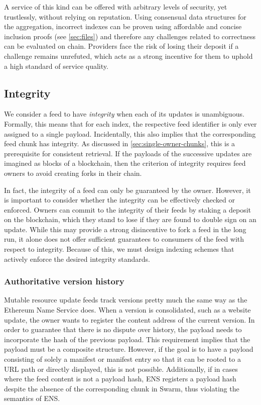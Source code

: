 A service of this kind can be offered with arbitrary levels of security, yet trustlessly, without relying on reputation. Using consensual data structures for the aggregation, incorrect indexes can be proven using affordable and concise inclusion proofs (see \ref{sec:files}) and therefore any challenges related to correctness can be evaluated on chain. Providers face the risk of losing their deposit if a challenge remains unrefuted, which acts as a strong incentive for them to uphold a high standard of service quality.

\subsection{Integrity \statusyellow}\label{sec:feed-integrity}

We consider a feed to have \emph{integrity} when each of its updates is unambiguous. Formally, this means that for each index, the respective feed identifier is only ever assigned to a single payload. Incidentally, this also implies that the corresponding feed chunk has integrity. As discussed in \ref{sec:single-owner-chunks}, this is a prerequisite for consistent retrieval. 
If the payloads of the successive updates are imagined as blocks of a blockchain, then the criterion of integrity requires feed owners to avoid creating forks in their chain. 

In fact, the integrity of a feed can only be guaranteed by the owner. However, it is important to consider whether the integrity can be effectively checked or enforced. Owners can commit to the integrity of their feeds by staking a deposit on the blockchain, which they stand to lose if they are found to double sign on an update. While this may provide a strong disincentive to fork a feed in the long run, it alone does not offer sufficient guarantees to consumers of the feed with respect to integrity. Because of this, we must design indexing schemes that actively enforce the desired integrity standards.

\subsubsection{Authoritative version history}

Mutable resource update feeds track versions pretty much the same way as the Ethereum Name Service does.  
When a version is consolidated, such as a website update, the owner wants to register the content address of the current version. In order to guarantee that there is no dispute over history, the payload needs to incorporate the hash of the previous payload. This requirement implies that the payload must be a composite structure. However, if the goal is to have a payload consisting of solely a manifest or manifest entry so that it can be rooted to a URL path or directly displayed, this is not possible. Additionally, if in cases where the feed content is not a payload hash, ENS registers a payload hash despite the absence of the corresponding chunk in Swarm, thus violating the semantics of ENS.

